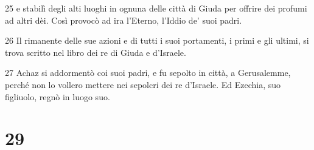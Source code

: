 \par 25 e stabilì degli alti luoghi in ognuna delle città di Giuda per offrire dei profumi ad altri dèi. Così provocò ad ira l'Eterno, l'Iddio de' suoi padri.
\par 26 Il rimanente delle sue azioni e di tutti i suoi portamenti, i primi e gli ultimi, si trova scritto nel libro dei re di Giuda e d'Israele.
\par 27 Achaz si addormentò coi suoi padri, e fu sepolto in città, a Gerusalemme, perché non lo vollero mettere nei sepolcri dei re d'Israele. Ed Ezechia, suo figliuolo, regnò in luogo suo.

\chapter{29}

